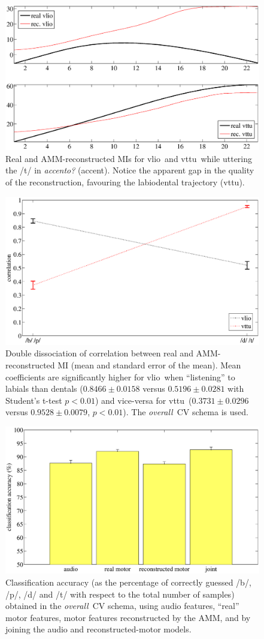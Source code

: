 \documentclass{pnastwo}
\newcommand{\vlio}{\textsf{vlio}}
\newcommand{\vttu}{\textsf{vttu}}
\newcommand{\overall}{\emph{overall}}
\begin{document}
\begin{figure}[t]
  \centerline{\includegraphics[width=.5\textwidth]{figs/figAccento_}}
  \caption{Real and AMM-reconstructed MIs for \vlio\ and \vttu\ while uttering
    the /t/ in \emph{accento?} (accent). Notice the apparent gap in the quality
    of the reconstruction, favouring the labiodental trajectory (\vttu).}
  \label{fig:example}
\end{figure}

\begin{figure}[t]
  \centerline{\includegraphics[width=.5\textwidth]{figs/figDD1Vel}}
  \caption{Double dissociation of correlation between real and AMM-reconstructed MI
    (mean and standard error of the mean). Mean coefficients are significantly
    higher for \vlio\ when ``listening'' to labials than dentals ($0.8466 \pm 0.0158$
    versus $0.5196 \pm 0.0281$ with Student's t-test $p<0.01$) and vice-versa
    for \vttu\ ($0.3731 \pm 0.0296$ versus $0.9528 \pm 0.0079$, $p<0.01$). The \overall\ CV
    schema is used.}
  \label{fig:DD}
\end{figure}

\begin{figure}[t]
  \centerline{\includegraphics[width=.5\textwidth]{figs/figClass1}}
  \caption{Classification accuracy (as the percentage of correctly guessed
    /b/, /p/, /d/ and /t/ with respect to the total number of samples) obtained
    in the \overall\ CV schema, using audio features, ``real'' motor features,
    motor features reconstructed by the AMM, and by joining the audio and
    reconstructed-motor models.}
  \label{fig:class1_perf}
\end{figure}
\end{document}
